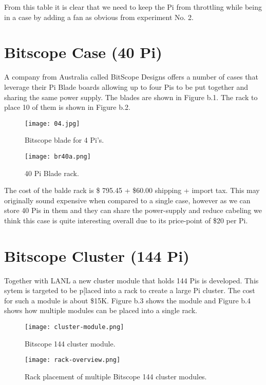 From this table it is clear that we need to keep the Pi from throttling
while being in a case by adding a fan as obvious from experiment No. 2.


\section{Bitscope Case (40 Pi)}\label{bitscope-case-40-pi}

A company from Australia called BitScope Designs offers a number of
cases that leverage their Pi Blade boards allowing up to four Pis to be
put together and sharing the same power supply. The blades are shown in
Figure b.1. The rack to place 10 of them is shown in Figure b.2.

\begin{figure}
\centering
\texttt{[image: 04.jpg]}
\caption{Bitscope blade for 4 Pi's.}
\end{figure}


\begin{figure}
\centering
\texttt{[image: br40a.png]}
\caption{40 Pi Blade rack.}
\end{figure}


The cost of the balde rack is \$ 795.45 + \$60.00 shipping + import tax.
This may originally sound expensive when compared to a single case,
however as we can store 40 Pis in them and they can share the
power-supply and reduce cabeling we think this case is quite interesting
overall due to its price-point of \$20 per Pi.

\section{Bitscope Cluster (144 Pi)}\label{bitscope-cluster-144-pi}

Together with LANL a new cluster module that holds 144 Pis is developed.
This sytem is targeted to be p{[}laced into a rack to create a large Pi
cluster. The cost for such a module is about \$15K. Figure b.3 shows the
module and Figure b.4 shows how multiple modules can be placed into a
single rack.

\begin{figure}
\centering
\texttt{[image: cluster-module.png]}
\caption{Bitscope 144 cluster module.}
\end{figure}

\begin{figure}
\centering
\texttt{[image: rack-overview.png]}
\caption{Rack placement of multiple Bitscope 144 cluster modules.}
\end{figure}




